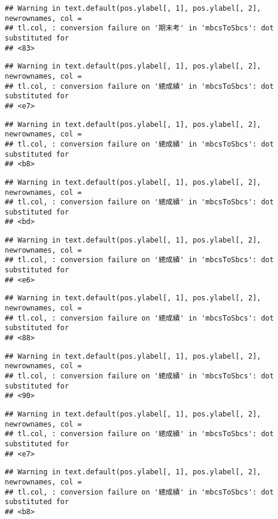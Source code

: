 \documentclass[
]{book}
\begin{document}
\begin{verbatim}
## Warning in text.default(pos.ylabel[, 1], pos.ylabel[, 2], newrownames, col =
## tl.col, : conversion failure on '期末考' in 'mbcsToSbcs': dot substituted for
## <83>
\end{verbatim}

\begin{verbatim}
## Warning in text.default(pos.ylabel[, 1], pos.ylabel[, 2], newrownames, col =
## tl.col, : conversion failure on '總成績' in 'mbcsToSbcs': dot substituted for
## <e7>
\end{verbatim}

\begin{verbatim}
## Warning in text.default(pos.ylabel[, 1], pos.ylabel[, 2], newrownames, col =
## tl.col, : conversion failure on '總成績' in 'mbcsToSbcs': dot substituted for
## <b8>
\end{verbatim}

\begin{verbatim}
## Warning in text.default(pos.ylabel[, 1], pos.ylabel[, 2], newrownames, col =
## tl.col, : conversion failure on '總成績' in 'mbcsToSbcs': dot substituted for
## <bd>
\end{verbatim}

\begin{verbatim}
## Warning in text.default(pos.ylabel[, 1], pos.ylabel[, 2], newrownames, col =
## tl.col, : conversion failure on '總成績' in 'mbcsToSbcs': dot substituted for
## <e6>
\end{verbatim}

\begin{verbatim}
## Warning in text.default(pos.ylabel[, 1], pos.ylabel[, 2], newrownames, col =
## tl.col, : conversion failure on '總成績' in 'mbcsToSbcs': dot substituted for
## <88>
\end{verbatim}

\begin{verbatim}
## Warning in text.default(pos.ylabel[, 1], pos.ylabel[, 2], newrownames, col =
## tl.col, : conversion failure on '總成績' in 'mbcsToSbcs': dot substituted for
## <90>
\end{verbatim}

\begin{verbatim}
## Warning in text.default(pos.ylabel[, 1], pos.ylabel[, 2], newrownames, col =
## tl.col, : conversion failure on '總成績' in 'mbcsToSbcs': dot substituted for
## <e7>
\end{verbatim}

\begin{verbatim}
## Warning in text.default(pos.ylabel[, 1], pos.ylabel[, 2], newrownames, col =
## tl.col, : conversion failure on '總成績' in 'mbcsToSbcs': dot substituted for
## <b8>
\end{verbatim}
\end{document}
